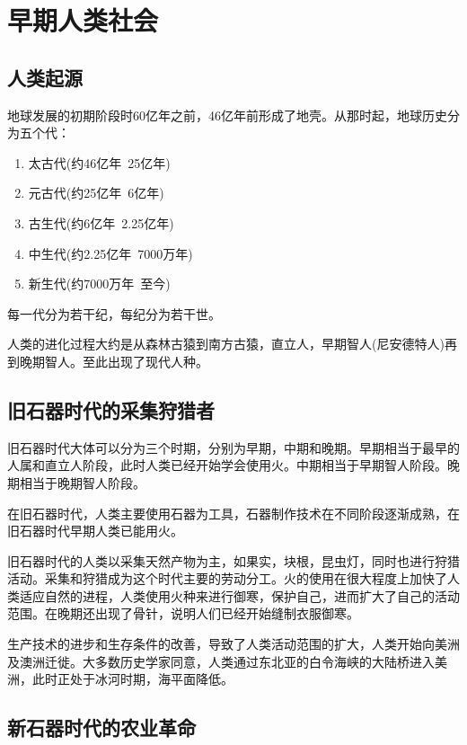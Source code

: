 \section{早期人类社会}
\subsection{人类起源}
地球发展的初期阶段时60亿年之前，46亿年前形成了地壳。从那时起，地球历史分为五个代：
\begin{enumerate}
    \item 太古代(约46亿年~25亿年)
    \item 元古代(约25亿年~6亿年)
    \item 古生代(约6亿年~2.25亿年)
    \item 中生代(约2.25亿年~7000万年)
    \item 新生代(约7000万年~至今)
\end{enumerate}

每一代分为若干纪，每纪分为若干世。

人类的进化过程大约是从森林古猿到南方古猿，直立人，早期智人(尼安德特人)再到晚期智人。至此出现了现代人种。

\subsection{旧石器时代的采集狩猎者}

旧石器时代大体可以分为三个时期，分别为早期，中期和晚期。早期相当于最早的人属和直立人阶段，此时人类已经开始学会使用火。中期相当于早期智人阶段。晚期相当于晚期智人阶段。

在旧石器时代，人类主要使用石器为工具，石器制作技术在不同阶段逐渐成熟，在旧石器时代早期人类已能用火。

旧石器时代的人类以采集天然产物为主，如果实，块根，昆虫灯，同时也进行狩猎活动。采集和狩猎成为这个时代主要的劳动分工。火的使用在很大程度上加快了人类适应自然的进程，人类使用火种来进行御寒，保护自己，进而扩大了自己的活动范围。在晚期还出现了骨针，说明人们已经开始缝制衣服御寒。

生产技术的进步和生存条件的改善，导致了人类活动范围的扩大，人类开始向美洲及澳洲迁徙。大多数历史学家同意，人类通过东北亚的白令海峡的大陆桥进入美洲，此时正处于冰河时期，海平面降低。

\subsection{新石器时代的农业革命}

